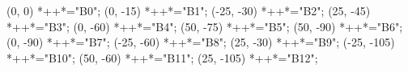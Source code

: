 \begin{scriptsize}
\xy(0, 0)
	*++{}*\frm{-,}="B0";
(0, -15)
	*++{}*\frm{-,}="B1";
(-25, -30)
	*++{}*\frm{-,}="B2";
(25, -45)
	*++{}*\frm{-,}="B3";
(0, -60)
	*++{}*\frm{-,}="B4";
(50, -75)
	*++{}*\frm{-,}="B5";
(50, -90)
	*++{}*\frm{-,}="B6";
(0, -90)
	*++{}*\frm{-,}="B7";
(-25, -60)
	*++{}*\frm{-,}="B8";
(25, -30)
	*++{}*\frm{-,}="B9";
(-25, -105)
	*++{}*\frm{-,}="B10";
(50, -60)
	*++{}*\frm{-,}="B11";
(25, -105)
	*++{}*\frm{-,}="B12";

\end{scriptsize}
